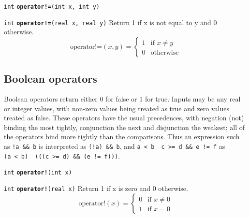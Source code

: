 \documentclass[
  10pt,
]{book}
\begin{document}

\texttt{int} \textbf{\texttt{operator!=}}\texttt{(int\ x,\ int\ y)}\newline


\texttt{int} \textbf{\texttt{operator!=}}\texttt{(real\ x,\ real\ y)}\newline
Return 1 if x is not equal to y and 0 otherwise. \[
\text{operator!=}(x,y) = \begin{cases} 1 & \text{if $x \neq y$} \\ 0 &
\text{otherwise} \end{cases} \]

\hypertarget{boolean-operators}{%
\subsection{Boolean operators}\label{boolean-operators}}

Boolean operators return either 0 for false or 1 for true. Inputs may
be any real or integer values, with non-zero values being treated as
true and zero values treated as false. These operators have the usual
precedences, with negation (not) binding the most tightly, conjunction
the next and disjunction the weakest; all of the operators bind more
tightly than the comparisons. Thus an expression such as \texttt{!a\ \&\&\ b} is
interpreted as \texttt{(!a)\ \&\&\ b}, and \texttt{a\ \textless{}\ b\ \textbar{}\textbar{}\ c\ \textgreater{}=\ d\ \&\&\ e\ !=\ f} as \texttt{(a\ \textless{}\ b)\ \textbar{}\textbar{}\ (((c\ \textgreater{}=\ d)\ \&\&\ (e\ !=\ f)))}.


\texttt{int} \textbf{\texttt{operator!}}\texttt{(int\ x)}\newline


\texttt{int} \textbf{\texttt{operator!}}\texttt{(real\ x)}\newline
Return 1 if x is zero and 0 otherwise. \[ \text{operator!}(x) =
\begin{cases} 0 & \text{if $x \neq 0$} \\ 1 & \text{if $x = 0$}
\end{cases} \]
\end{document}
